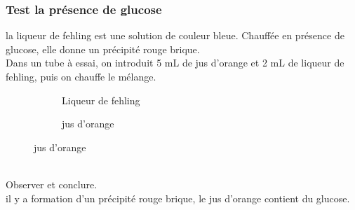 \documentclass[12pt,a4paper]{book}
\begin{document}
{\subsubsection{Test la présence de glucose}
\noindent
la liqueur de fehling est une solution de couleur bleue. Chauffée en présence de glucose, elle donne un précipité rouge brique.\\
Dans un tube à essai, on introduit 5 mL de jus d'orange et 2 mL de liqueur de fehling, puis on chauffe le mélange.
\begin{figure}[!h]
\begin{subfigure}{.5\textwidth}
  \centering
  \caption{Liqueur de fehling}
  \label{fig:c1im1_2}
\end{subfigure}%
\begin{subfigure}{.5\textwidth}
  \centering
  \caption{jus d'orange}
  \label{fig:c1im1_1}
\end{subfigure}
\label{fig:c1im1_2}
\end{figure}\\
Observer et conclure.\\
il y a formation d'un précipité rouge brique, le jus d'orange contient du glucose.
}
\end{document}
